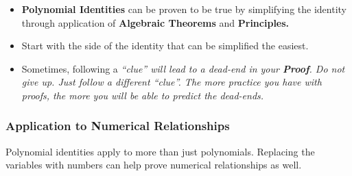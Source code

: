 
\begin{definition}
    \begin{itemize}
        \item \textbf{Polynomial Identities} can be proven to be true by simplifying
          the identity through application of \textbf{Algebraic Theorems} and \bf{Principles}.
        \item Start with the side of the identity that can be simplified the easiest.
        \item Sometimes, following a \it{“clue”} will lead to a dead-end in your
          \textbf{Proof}. Do not give up. Just follow a different \it{“clue”}. The more practice you have with proofs, the more you will be able to predict the dead-ends.
    \end{itemize}
\end{definition}

\begin{example}

\end{example}

\subsubsection*{Application to Numerical Relationships}

Polynomial identities apply to more than just polynomials. Replacing the variables with numbers can help prove numerical relationships as well.

\newpage
